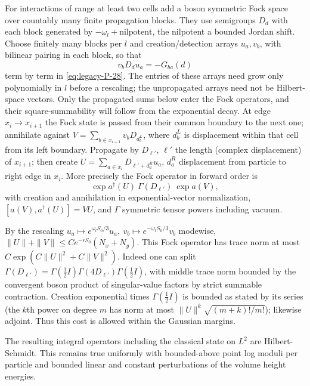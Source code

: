 For interactions of range at least two cells add a boson symmetric Fock space over countably many finite propagation blocks. They use semigroups \(D_d\) with each block generated by \(-\omega_l+\text{nilpotent}\), the nilpotent a bounded Jordan shift. Choose finitely many blocks per \(l\) and creation/detection arrays \(u_a,v_b\), with bilinear pairing in each block, so that
\[
 v_b D_d u_a=-G_{ba}(d)
\]
term by term in \eqref{eq:legacy-P-28}. The entries of these arrays need grow only polynomially in \(l\) before a rescaling; the unpropagated arrays need not be Hilbert-space vectors. Only the propagated sums below enter the Fock operators, and their square-summability will follow from the exponential decay. At edge \(x_i\to x_{i+1}\) the Fock state is passed from their common boundary to the next one; annihilate against \(V=\sum_{b\in x_{i+1}} v_b D_{d_b^L}\), where \(d_b^L\) is displacement within that cell from its left boundary. Propagate by \(D_{\ell'}\), \(\ell'\) the length (complex displacement) of \(x_{i+1}\); then create \(U=\sum_{a\in x_i}D_{\ell'+d_a^R}u_a\), \(d_a^R\) displacement from particle to right edge in \(x_i\). More precisely the Fock operator in forward order is
\[
 \exp a^\dagger(U)\ \Gamma(D_{\ell'})\ \exp a(V),
\]
with creation and annihilation in exponential-vector normalization, \([a(V),a^\dagger(U)]=VU\), and \(\Gamma\) symmetric tensor powers including vacuum.

By the rescaling \(u_a\mapsto e^{\omega_l S_0/3} u_a,\ v_b\mapsto e^{-\omega_l S_0/3}v_b\) modewise, \(\|U\|+\|V\|\le Ce^{-\epsilon S_0}(N_x+N_y)\). This Fock operator has trace norm at most \(C\exp(C\|U\|^2+C\|V\|^2)\). Indeed one can split \(\Gamma(D_{\ell'})=\Gamma(\tfrac12 I)\Gamma(4D_{\ell'})\Gamma(\tfrac12 I)\), with middle trace norm bounded by the convergent boson product of singular-value factors by strict summable contraction. Creation exponential times \(\Gamma(\tfrac12 I)\) is bounded as stated by its series (the \(k\)th power on degree \(m\) has norm at most \(\|U\|^k\sqrt{(m+k)!/m!}\)); likewise adjoint. Thus this cost is allowed within the Gaussian margins.

The resulting integral operators including the classical state on \(L^2\) are Hilbert-Schmidt. This remains true uniformly with bounded-above point log moduli per particle and bounded linear and constant perturbations of the volume height energies.




